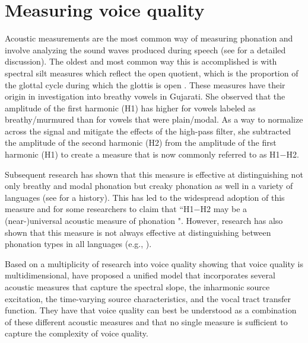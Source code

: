 \section{Measuring voice quality} \label{sec:measuring_voice_quality}

Acoustic measurements are the most common way of measuring phonation and involve analyzing the sound waves produced during speech (see \cite{garellekPhoneticsVoice2019} for a detailed discussion). The oldest and most common way this is accomplished is with spectral silt measures which reflect the open quotient, which is the proportion of the glottal cycle during which the glottis is open \citep{holmbergComparisonsAerodynamicElectroglottographic1995}. These measures have their origin in  investigation into breathy vowels in Gujarati. She observed that the amplitude of the first harmonic (H1) has higher for vowels labeled as breathy/murmured than for vowels that were plain/modal. As a way to normalize across the signal and mitigate the effects of the high-pass filter, she subtracted the amplitude of the second harmonic (H2) from the amplitude of the first harmonic (H1) to create a measure that is now commonly referred to as H1$-$H2. 

Subsequent research has shown that this measure is effective at distinguishing not only breathy and modal phonation but creaky phonation as well in a variety of languages (see \cite{garellekTheoreticalAchievementsPhonetics2022} for a history). This has led to the widespread adoption of this measure and for some researchers to claim that ``H1$-$H2 may be a (near-)universal acoustic measure of phonation \citep[8]{espositoCrosslinguisticPatternsPhonation2020}". However, research has also shown that this measure is not always effective at distinguishing between phonation types in all languages (e.g., \cite{brinkerhoffUsingResidualH12025,chaiH1H2AcousticMeasure2022,espositoVariationContrastivePhonation2010,simpsonFirstSecondHarmonics2012}). 

Based on a multiplicity of research into voice quality showing that voice quality is multidimensional, \citet{kreimanUnifiedTheoryVoice2014,kreimanValidatingPsychoacousticModel2021} have proposed a unified model that incorporates several acoustic measures that capture the spectral slope, the inharmonic source excitation, the time-varying source characteristics, and the vocal tract transfer function. They have that voice quality can best be understood as a combination of these different acoustic measures and that no single measure is sufficient to capture the complexity of voice quality.



